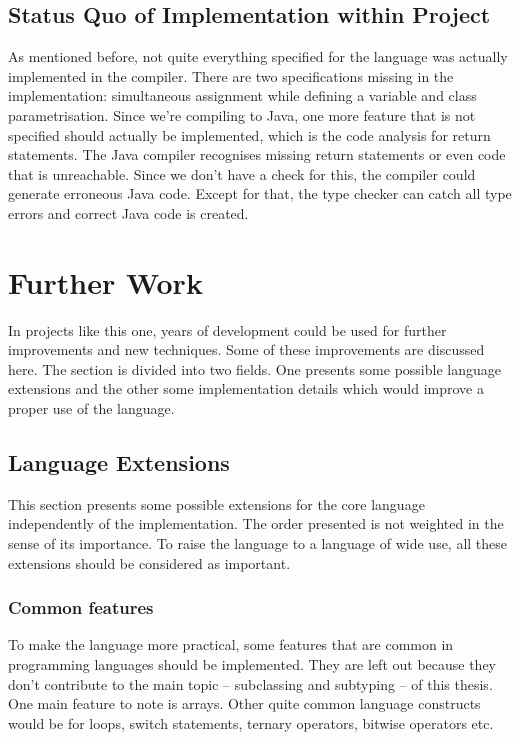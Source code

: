 \subsection{Status Quo of Implementation within Project}
\label{sec:statusQuo}

As mentioned before, not quite everything specified for the language
was actually implemented in the compiler. There are two specifications missing
in the implementation: simultaneous assignment while defining a variable
and class parametrisation. Since we're compiling to Java, one more feature that
is not specified should actually be implemented, which is the code analysis
for return statements. The Java compiler recognises missing return statements
or even code that is unreachable. Since we don't have a check for this, the 
compiler could generate erroneous Java code. Except for that, the type checker
can catch all type errors and correct Java code is created.

\section{Further Work}
\label{sec:futureWork}
In projects like this one, years of development could be used for
further improvements and new techniques. Some of these improvements are
discussed here. The section is divided into two fields. One presents some
possible language extensions and the other some implementation details
which would improve a proper use of the language.

\subsection{Language Extensions}
This section presents some possible extensions for the core language
independently of the implementation. The order presented is not weighted
in the sense of its importance. To raise the language to a language
of wide use, all these extensions should be considered as important.

\subsubsection{Common features}
To make the language more practical, some features that are common
in programming languages should be implemented. They are left out
because they don't contribute to the main topic -- subclassing and subtyping --
of this thesis.
One main feature to note is arrays. Other quite common language constructs
would be for loops, switch statements, ternary operators, bitwise operators
etc. 


